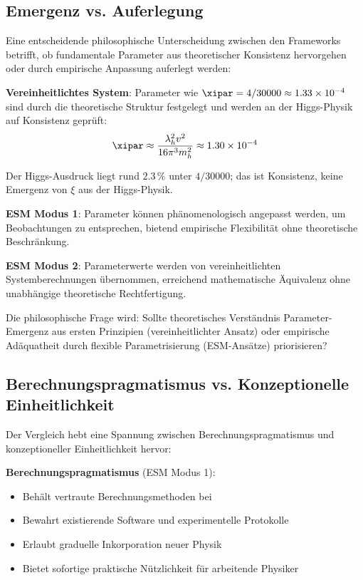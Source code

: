 	\subsection{Emergenz vs. Auferlegung}
	\label{subsec:emergence_imposition}
	
	Eine entscheidende philosophische Unterscheidung zwischen den Frameworks betrifft, ob fundamentale Parameter aus theoretischer Konsistenz hervorgehen oder durch empirische Anpassung auferlegt werden:
	
	\textbf{Vereinheitlichtes System}: Parameter wie $\xipar = 4/30000 \approx 1.33 \times 10^{-4}$ sind durch die theoretische Struktur festgelegt und werden an der Higgs-Physik auf Konsistenz geprüft:
	\begin{equation}
		\xipar \approx \frac{\lambda_h^2 v^2}{16\pi^3 m_h^2} \approx 1.30 \times 10^{-4}
	\end{equation}
	
	Der Higgs-Ausdruck liegt rund $2.3\,\%$ unter $4/30000$; das ist Konsistenz, keine Emergenz von $\xi$ aus der Higgs-Physik.
	
	\textbf{ESM Modus 1}: Parameter können phänomenologisch angepasst werden, um Beobachtungen zu entsprechen, bietend empirische Flexibilität ohne theoretische Beschränkung.
	
	\textbf{ESM Modus 2}: Parameterwerte werden von vereinheitlichten Systemberechnungen übernommen, erreichend mathematische Äquivalenz ohne unabhängige theoretische Rechtfertigung.
	
	Die philosophische Frage wird: Sollte theoretisches Verständnis Parameter-Emergenz aus ersten Prinzipien (vereinheitlichter Ansatz) oder empirische Adäquatheit durch flexible Parametrisierung (ESM-Ansätze) priorisieren?
	
	\subsection{Berechnungspragmatismus vs. Konzeptionelle Einheitlichkeit}
	\label{subsec:pragmatism_vs_elegance}
	
	Der Vergleich hebt eine Spannung zwischen Berechnungspragmatismus und konzeptioneller Einheitlichkeit hervor:
	
	\textbf{Berechnungspragmatismus} (ESM Modus 1):
	\begin{itemize}
		\item Behält vertraute Berechnungsmethoden bei
		\item Bewahrt existierende Software und experimentelle Protokolle
		\item Erlaubt graduelle Inkorporation neuer Physik
		\item Bietet sofortige praktische Nützlichkeit für arbeitende Physiker
	\end{itemize}
	
